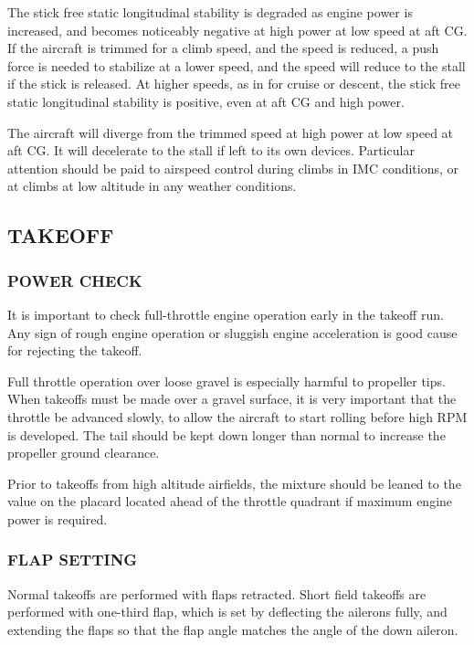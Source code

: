 The stick free static longitudinal stability is degraded as engine power is increased, and becomes noticeably negative at high power at low speed at aft CG. If the aircraft is trimmed for a climb speed, and the speed is reduced, a push force is needed to stabilize at a lower speed, and the speed will reduce to the stall if the stick is released. At higher speeds, as in for cruise or descent, the stick free static longitudinal stability is positive, even at aft CG and high power.
 
\begin{Note}[WARNING]
The aircraft will diverge from the trimmed speed at high power at low speed at aft CG. It will decelerate to the stall if left to its own devices. Particular attention should be paid to airspeed control during climbs in IMC conditions, or at climbs at low altitude in any weather conditions.
\end{Note}

\subsection{TAKEOFF}
  \subsubsection{POWER CHECK}
    It is important to check full-throttle engine operation early in the takeoff run. Any sign of rough engine operation or sluggish engine acceleration is good cause for rejecting the takeoff.
    
    Full throttle operation over loose gravel is especially harmful to propeller tips. When takeoffs must be made over a gravel surface, it is very important that the throttle be advanced slowly, to allow the aircraft to start rolling before high RPM is developed. The tail should be kept down longer than normal to increase the propeller ground clearance.
    
    Prior to takeoffs from high altitude airfields, the mixture should be leaned to the value on the placard located ahead of the throttle quadrant if maximum engine power is required.
    
  \subsubsection{FLAP SETTING}
    Normal takeoffs are performed with flaps retracted. Short field takeoffs are performed with one-third flap, which is set by deflecting the ailerons fully, and extending the flaps so that the flap angle matches the angle of the down aileron.
    
